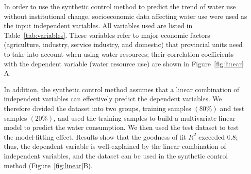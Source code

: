 
In order to use the synthetic control method to predict the trend of water use without institutional change, socioeconomic data affecting water use were used as the input independent variables. All variables used are listed in Table~\ref{tab:variables}.
These variables refer to major economic factors (agriculture, industry, service industry, and domestic) that provincial units need to take into account when using water resources; their correlation coefficients with the dependent variable (water resource use) are shown in Figure~\ref{fig:linear} A.

In addition, the synthetic control method assumes that a linear combination of independent variables can effectively predict the dependent variables.
We therefore divided the dataset into two groups, training samples $(80\%)$ and test samples $(20\%)$, and used the training samples to build a multivariate linear model to predict the water consumption. We then used the test dataset to test the model-fitting effect.
Results show that the goodness of fit $R^2$ exceeded $0.8$; thus, the dependent variable is well-explained by the linear combination of independent variables, and the dataset can be used in the synthetic control method (Figure~\ref{fig:linear}B).


